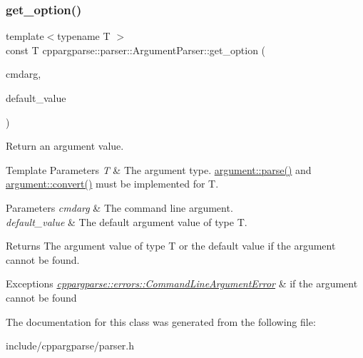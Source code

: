 \subsubsection{\texorpdfstring{get\+\_\+option()}{get\_option()}\hspace{0.1cm}{\footnotesize\ttfamily [2/2]}}
{\footnotesize\ttfamily template$<$typename T $>$ \\
const T cppargparse\+::parser\+::\+Argument\+Parser\+::get\+\_\+option (\begin{DoxyParamCaption}\item[{const \hyperlink{structcppargparse_1_1types_1_1CommandLineArgument__t}{types\+::\+Command\+Line\+Argument\+\_\+t} \&}]{cmdarg,  }\item[{const T \&}]{default\+\_\+value }\end{DoxyParamCaption})\hspace{0.3cm}{\ttfamily [inline]}}



Return an argument value. 


\begin{DoxyTemplParams}{Template Parameters}
{\em T} & The argument type. \hyperlink{structcppargparse_1_1argument_a9b5feac6fe8cf18beb63d85c0840cd84}{argument\+::parse()} and \hyperlink{structcppargparse_1_1argument_a2051f71ef4ed0b9d299cc58bb494e42b}{argument\+::convert()} must be implemented for T.\\
\hline
\end{DoxyTemplParams}

\begin{DoxyParams}{Parameters}
{\em cmdarg} & The command line argument. \\
\hline
{\em default\+\_\+value} & The default argument value of type T.\\
\hline
\end{DoxyParams}
\begin{DoxyReturn}{Returns}
The argument value of type T or the default value if the argument cannot be found. 
\end{DoxyReturn}

\begin{DoxyExceptions}{Exceptions}
{\em \hyperlink{classcppargparse_1_1errors_1_1CommandLineArgumentError}{cppargparse\+::errors\+::\+Command\+Line\+Argument\+Error}} & if the argument cannot be found \\
\hline
\end{DoxyExceptions}


The documentation for this class was generated from the following file\+:\begin{DoxyCompactItemize}
\item 
include/cppargparse/parser.\+h\end{DoxyCompactItemize}
